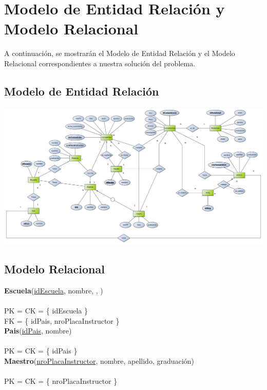 \section{Modelo de Entidad Relación y Modelo Relacional}

A continuación, se mostrarán el Modelo de Entidad Relación y el Modelo Relacional correspondientes a nuestra solución del problema.\\

\subsection{Modelo de Entidad Relación}


\begin{center}
\includegraphics[width=20cm,keepaspectratio,angle=90]{./imagenes/DER.pdf}\newline
\end{center}

\newpage
\subsection{Modelo Relacional}

\noindent\textbf{Escuela}(\uline{idEscuela}, nombre, , ) 
\\
\\
PK = CK = \{ idEscuela \} \\
FK = \{ idPais, nroPlacaInstructor \} \\

\noindent\textbf{Pais}(\uline{idPais}, nombre)
\\
\\
PK = CK = \{ idPais \} \\

\noindent\textbf{Maestro}(\uline{nroPlacaInstructor}, nombre, apellido, graduación)
\\
\\
PK = CK = \{ nroPlacaInstructor \} \\

